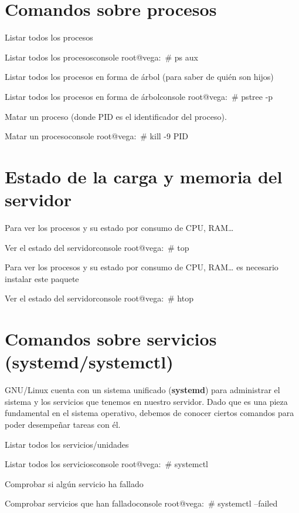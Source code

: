 \section{Comandos sobre procesos}
Listar todos los procesos
\begin{mycode}{Listar todos los procesos}{console}{}
root@vega:~# ps aux
\end{mycode}

Listar todos los procesos en forma de árbol (para saber de quién son hijos)
\begin{mycode}{Listar todos los procesos en forma de árbol}{console}{}
root@vega:~# pstree -p
\end{mycode}

Matar un proceso (donde PID es el identificador del proceso).
\begin{mycode}{Matar un proceso}{console}{}
root@vega:~# kill -9 PID
\end{mycode}

\section{Estado de la carga y memoria del servidor}
Para ver los procesos y su estado por consumo de CPU, RAM…
\begin{mycode}{Ver el estado del servidor}{console}{}
root@vega:~# top
\end{mycode}

Para ver los procesos y su estado por consumo de CPU, RAM… es necesario instalar este paquete
\begin{mycode}{Ver el estado del servidor}{console}{}
root@vega:~# htop
\end{mycode}

\section{Comandos sobre servicios (systemd/systemctl)}
GNU/Linux cuenta con un sistema unificado (\textbf{systemd}) para administrar el sistema y los servicios que tenemos en nuestro servidor. Dado que es una pieza fundamental en el sistema operativo, debemos de conocer ciertos comandos para poder desempeñar tareas con él.

Listar todos los servicios/unidades
\begin{mycode}{Listar todos los servicios}{console}{}
root@vega:~# systemctl
\end{mycode}

Comprobar si algún servicio ha fallado
\begin{mycode}{Comprobar servicios que han fallado}{console}{}
root@vega:~# systemctl --failed
\end{mycode}

